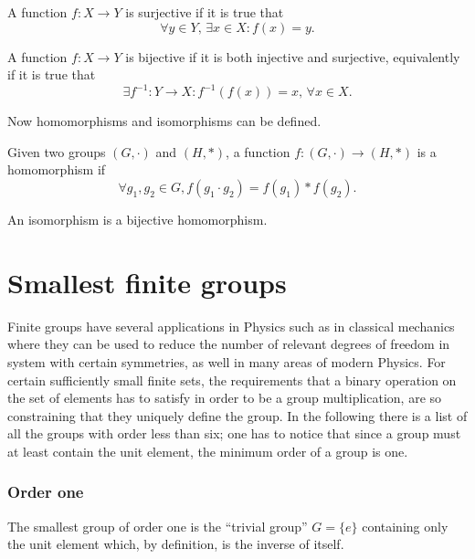 \begin{defn}
    A function $f : X \to Y$ is surjective if it is true that 
    \begin{equation}
        \forall y \in Y,\, \exists x \in X : f(x) = y.
    \end{equation}
\end{defn}
\begin{defn}
    A function $f : X \to Y$ is bijective if it is both injective and surjective, equivalently if it is true that
    \begin{equation}
        \exists f^{-1} : Y \to X : f^{-1}(f(x)) = x,\,\forall x \in X. 
    \end{equation}
\end{defn}
Now homomorphisms and isomorphisms can be defined.
\begin{defn}[homomorphism]
    Given two groups $(G,\cdot)$ and $(H,*)$, a function $f : (G,\cdot) \to (H,*)$ is a homomorphism if
    \begin{equation}
        \forall g_1,g_2 \in G, f(g_1 \cdot g_2) = f(g_1) * f(g_2).
    \end{equation}
\end{defn}
\begin{defn}[isomorphism]
    An isomorphism is a bijective homomorphism.
\end{defn}

\section{Smallest finite groups}
Finite groups have several applications in Physics such as in classical mechanics where they can be used to reduce the number of relevant degrees of freedom in system with certain symmetries, as well in many areas of modern Physics. For certain sufficiently small finite sets, the requirements that a binary operation on the set of elements has to satisfy in order to be a group multiplication, are so constraining that they uniquely define the group. In the following there is a list of all the groups with order less than six; one has to notice that since a group must at least contain the unit element, the minimum order of a group is one.

\subsubsection{Order one}
The smallest group of order one is the ``trivial group'' $G = \{e\}$ containing only the unit element which, by definition, is the inverse of itself. 

